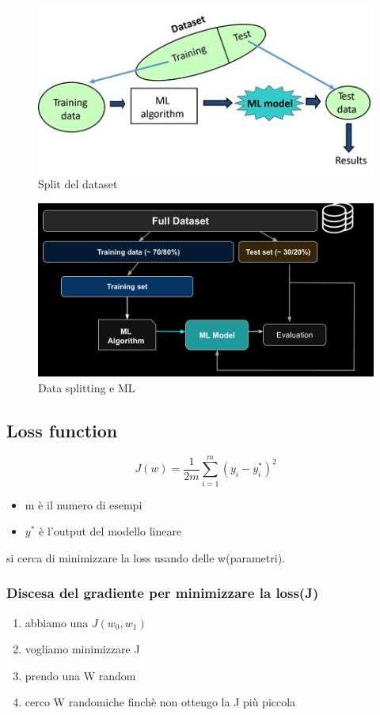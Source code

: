 \begin{figure}[H]
    \centering
    \includegraphics[width=0.5\linewidth]{imgs/18 - split}
    \caption{Split del dataset}
    \label{fig:split}
\end{figure}



\begin{figure}[H]
    \centering
    \includegraphics[width=0.5\linewidth]{imgs/19 - split2}
    \caption{Data splitting e ML}
    \label{fig:split_ML}
\end{figure}


\subsection{Loss function}
\begin{equation}
    J(w) = \frac{1}{2m}\sum_{i=1}^{m}(y_i-y_i^*)^2
\end{equation}
\begin{itemize}
    \item m è il numero di esempi
    \item $y^*$ è l'output del modello lineare
\end{itemize}
si cerca di minimizzare la loss usando delle w(parametri).

\subsubsection{Discesa del gradiente per minimizzare la loss(J)}

\begin{enumerate}
    \item abbiamo una $J(w_0,w_1)$
    \item vogliamo minimizzare J
    \item prendo una W random
    \item cerco W randomiche finchè non ottengo la J più piccola
\end{enumerate}

